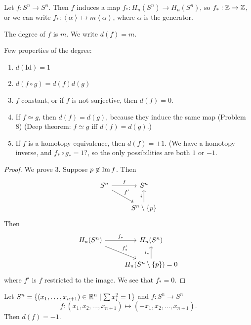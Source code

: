 Let $f: S^{n} \to  S^{n}$.
Then $f$ induces a map $f_*: H_n(S^{n}) \to  H_n(S^{n})$, so $f_*: \mathbb{Z} \to  \mathbb{Z}$,
or we can write $f_*: \left< \alpha\right> \mapsto m \left<\alpha \right>$, where $\alpha$ is the generator.
\begin{definition}
    The degree of $f$ is $m$. 
    We write $d(f) = m$.
\end{definition}
\begin{prop} Few properties of the degree:
    \begin{enumerate}
        \item $d(\text{Id}) = 1$
        \item  $d(f  \circ  g) = d(f) d(g)$ 
        \item  $f$ constant, or if $f$ is not surjective, then $d(f) = 0$.
        \item If $f \simeq g$, then $d(f) = d(g)$, because they induce the same map (Problem 8)
            (Deep theorem:  $f \simeq g$ iff $d(f) = d(g)$.)
        \item If $f$ is a homotopy equivalence, then $d(f) = \pm 1$.
            (We have a homotopy inverse, and  $f_*  \circ  g_* = 1$?, so the only possibilities are both $1$ or $-1$.
    \end{enumerate}
\end{prop}
\begin{proof}
    We prove 3.
    Suppose $p \not\in  \operatorname{Im} f$.
    Then
    \[
        \begin{tikzcd}
            S^{n} \arrow[dr, "f'"] \arrow[r, "f"] & S^{n}\\
                                                 & S^{n} \setminus \{p\}  \arrow[u, "i"]
        \end{tikzcd}
    \]
    Then
    \[
        \begin{tikzcd}
            H_n(S^{n}) \arrow[dr, "f'_*"] \arrow[r, "f_*"] & H_n(S^{n})\\
                                                           & H_n(S^{n} \setminus \{p\}) = 0  \arrow[u, "i_*"]
        \end{tikzcd}
    \]
    where $f'$ is $f$ restricted to the image.
    We see that $f_* = 0$.
\end{proof}



\begin{theorem}
    Let $S^{n} = \{(x_1, \ldots, x_{n+1})\in \mathbb{R}^n  \mid  \sum x_i^2 = 1\}$ and $f: S^{n} \to  S^{n}$ 
    \[
        f: (x_1, x_2, \ldots, x_{n+1}) \mapsto 
        (-x_1, x_2, \ldots, x_{n+1})
    .\] 
    Then $d(f) = -1$.
\end{theorem}

